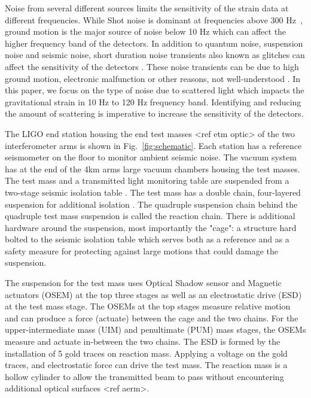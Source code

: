 \documentclass[12pt]{iopart}
\begin{document}
Noise from several different sources limits the sensitivity of the strain data at different frequencies. 
While Shot noise is dominant at frequencies above 300 Hz~\cite{tjthesis}, ground motion is the major source of noise below 10 Hz which can affect the higher frequency band of the detectors. In addition to quantum noise, suspension noise and seismic noise, short duration noise transients also known as glitches can affect the sensitivity of the detectors \cite{transientpaper}. These noise transients can be due to high ground motion, electronic malfunction or other reasons, not well-understood \cite{noisepaper,Cabero_2019}. In this paper, we focus on the type of noise due to scattered light which impacts the gravitational strain in 10 Hz to 120 Hz frequency band.  Identifying and reducing the amount of scattering is imperative to increase the sensitivity of the detectors. 
 
The LIGO end station housing the end test masses <ref etm optic> of the two interferometer arms is shown in Fig.~\ref{fig:schematic}. Each station has a reference seismometer on the floor to monitor ambient seismic noise. The vacuum system has at the end of the 4km arms large vacuum chambers housing the test masses. The test mass and a transmitted light monitoring table are suspended from a two-stage seismic isolation table \cite{Matichard_2015}. The test mass has a double chain, four-layered suspension for additional isolation \cite{Aston_2012}. The quadruple suspension chain behind the quadruple test mass suspension is called the reaction chain. There is additional hardware around the suspension, most importantly the "cage": a structure hard bolted to the seismic isolation table which serves both as a reference and as a safety measure for protecting against large motions that could damage the suspension.

The suspension for the test mass uses Optical Shadow sensor and Magnetic actuators (OSEM)  at the top three stages as well as an electrostatic drive (ESD) at the test mass stage. The OSEMs at the top stages measure relative motion and can produce a force (actuate) between the cage and the two chains. For the upper-intermediate mass (UIM) and penultimate (PUM) mass stages, the OSEMs measure and actuate in-between the two chains. The ESD is formed by the installation of 5 gold traces on reaction mass. Applying a voltage on the gold traces, and electrostatic force can drive the test mass.  The reaction mass is a hollow cylinder to allow the transmitted beam to pass without encountering additional optical surfaces <ref aerm>.
\end{document}

